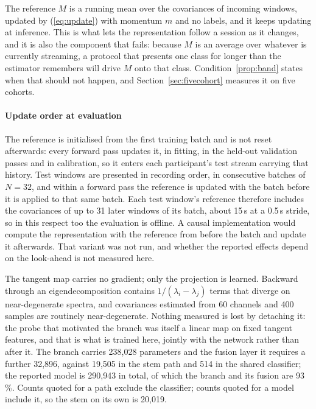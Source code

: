 \documentclass[a4paper,fleqn]{cas-dc}
\begin{document}
The reference $M$ is a running mean over the covariances of incoming windows, updated by (\ref{eq:update}) with momentum $m$ and no labels, and it keeps updating at inference. This is what lets the representation follow a session as it changes, and it is also the component that fails: because $M$ is an average over whatever is currently streaming, a protocol that presents one class for longer than the estimator remembers will drive $M$ onto that class. Condition~\ref{prop:band} states when that should not happen, and Section~\ref{sec:fivecohort} measures it on five cohorts.

\paragraph{Update order at evaluation} The reference is initialised from the first training batch and is not reset afterwards: every forward pass updates it, in fitting, in the held-out validation passes and in calibration, so it enters each participant's test stream carrying that history. Test windows are presented in recording order, in consecutive batches of $N = 32$, and within a forward pass the reference is updated with the batch before it is applied to that same batch. Each test window's reference therefore includes the covariances of up to 31 later windows of its batch, about 15\,s at a 0.5\,s stride, so in this respect too the evaluation is offline. A causal implementation would compute the representation with the reference from before the batch and update it afterwards. That variant was not run, and whether the reported effects depend on the look-ahead is not measured here. 

The tangent map carries no gradient; only the projection is learned. Backward through an eigendecomposition contains $1/(\lambda_i - \lambda_j)$ terms that diverge on near-degenerate spectra, and covariances estimated from 60 channels and 400 samples are routinely near-degenerate. Nothing measured is lost by detaching it: the probe that motivated the branch was itself a linear map on fixed tangent features, and that is what is trained here, jointly with the network rather than after it. The branch carries 238{,}028 parameters and the fusion layer it requires a further 32{,}896, against 19{,}505 in the stem path and 514 in the shared classifier; the reported model is 290{,}943 in total, of which the branch and its fusion are 93\,\%. Counts quoted for a path exclude the classifier; counts quoted for a model include it, so the stem on its own is 20{,}019.
\end{document}

